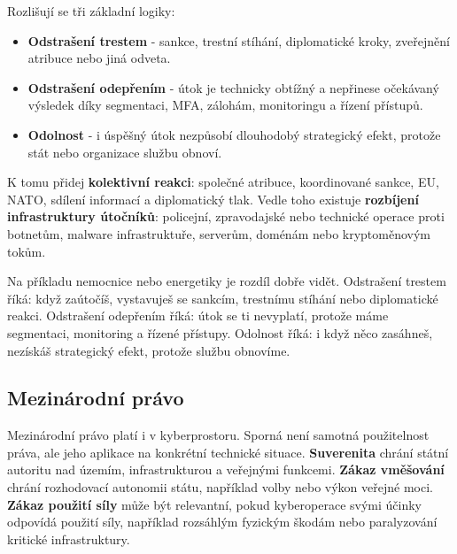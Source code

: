 Rozlišují se tři základní logiky:
\begin{itemize}
  \item \textbf{Odstrašení trestem} - sankce, trestní stíhání, diplomatické kroky, zveřejnění atribuce nebo jiná odveta.
  \item \textbf{Odstrašení odepřením} - útok je technicky obtížný a nepřinese očekávaný výsledek díky segmentaci, MFA, zálohám, monitoringu a řízení přístupů.
  \item \textbf{Odolnost} - i úspěšný útok nezpůsobí dlouhodobý strategický efekt, protože stát nebo organizace službu obnoví.
\end{itemize}

K tomu přidej \textbf{kolektivní reakci}: společné atribuce, koordinované sankce, EU, NATO, sdílení informací a diplomatický tlak. Vedle toho existuje \textbf{rozbíjení infrastruktury útočníků}: policejní, zpravodajské nebo technické operace proti botnetům, malware infrastruktuře, serverům, doménám nebo kryptoměnovým tokům.



Na příkladu nemocnice nebo energetiky je rozdíl dobře vidět. Odstrašení trestem říká: když zaútočíš, vystavuješ se sankcím, trestnímu stíhání nebo diplomatické reakci. Odstrašení odepřením říká: útok se ti nevyplatí, protože máme segmentaci, monitoring a řízené přístupy. Odolnost říká: i když něco zasáhneš, nezískáš strategický efekt, protože službu obnovíme.

\subsection*{Mezinárodní právo}
Mezinárodní právo platí i v kyberprostoru. Sporná není samotná použitelnost práva, ale jeho aplikace na konkrétní technické situace. \textbf{Suverenita} chrání státní autoritu nad územím, infrastrukturou a veřejnými funkcemi. \textbf{Zákaz vměšování} chrání rozhodovací autonomii státu, například volby nebo výkon veřejné moci. \textbf{Zákaz použití síly} může být relevantní, pokud kyberoperace svými účinky odpovídá použití síly, například rozsáhlým fyzickým škodám nebo paralyzování kritické infrastruktury.


